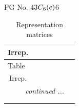 \documentclass[fleqn,8pt,landscape]{jsarticle}
\begin{document}
\setcounter{MaxMatrixCols}{32}

\renewcommand{\tablename}{Table~}
\renewcommand{\figurename}{Figure~}
\begin{center}
\LARGE
PG No. 43\quad$C_{\rm 6}(c)$\quad$6$\quad[ hexagonal ]
\end{center}
\renewcommand{\arraystretch}{1.2}
\begin{longtable}{ccccccc}
\caption{Representation matrices}
 \\
 \hline \hline
Irrep. &  &  &  &  &  &  \\ \hline \endfirsthead

\multicolumn{6}{l}{\tablename\ \thetable{}} \\
 \hline \hline
Irrep. &  &  &  &  &  &  \\ \hline \endhead

 \hline \hline
\multicolumn{6}{r}{\footnotesize\it continued ...} \\ \endfoot

 \hline \hline
\multicolumn{6}{r}{} \\ \endlastfoot


\end{longtable}
\end{document}
